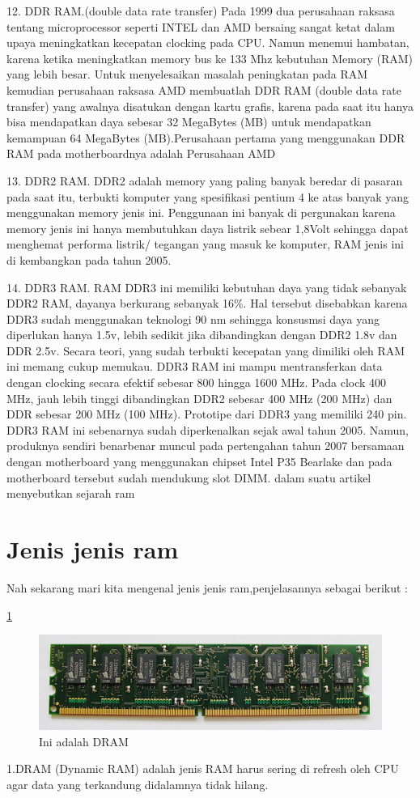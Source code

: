 12. DDR RAM.(double data rate transfer) Pada 1999 dua perusahaan raksasa tentang microprocessor seperti INTEL dan AMD bersaing sangat ketat dalam upaya meningkatkan kecepatan clocking pada CPU. Namun menemui hambatan, karena ketika meningkatkan memory bus ke 133 Mhz kebutuhan Memory (RAM) yang lebih besar. Untuk menyelesaikan masalah peningkatan pada RAM kemudian perusahaan raksasa AMD membuatlah DDR RAM (double data rate transfer) yang awalnya disatukan dengan kartu grafis, karena pada saat itu hanya bisa mendapatkan daya sebesar 32 MegaBytes (MB) untuk mendapatkan kemampuan 64 MegaBytes (MB).Perusahaan pertama yang menggunakan DDR RAM pada motherboardnya adalah Perusahaan AMD

13. DDR2 RAM. DDR2 adalah memory yang paling banyak beredar di pasaran pada saat itu, terbukti komputer yang spesifikasi pentium 4 ke atas banyak yang menggunakan memory jenis ini. Penggunaan ini banyak di pergunakan karena memory jenis ini hanya membutuhkan daya listrik sebear 1,8Volt sehingga dapat menghemat performa listrik/ tegangan yang masuk ke komputer, RAM jenis ini di kembangkan pada tahun 2005.

14. DDR3 RAM. RAM DDR3 ini memiliki kebutuhan daya yang tidak sebanyak DDR2 RAM, dayanya berkurang sebanyak 16\%. Hal tersebut disebabkan karena DDR3 sudah menggunakan teknologi 90 nm sehingga konsusmsi daya yang diperlukan hanya 1.5v, lebih sedikit jika dibandingkan dengan DDR2 1.8v dan DDR 2.5v. Secara teori, yang sudah terbukti kecepatan yang dimiliki oleh RAM ini memang cukup memukau. DDR3 RAM ini mampu mentransferkan data dengan clocking secara efektif sebesar 800 hingga 1600 MHz. Pada clock 400 MHz, jauh lebih tinggi dibandingkan DDR2 sebesar 400 MHz (200 MHz) dan DDR sebesar 200 MHz (100 MHz). Prototipe dari DDR3 yang memiliki 240 pin. DDR3 RAM ini sebenarnya sudah diperkenalkan sejak awal tahun 2005. Namun, produknya sendiri benar\-benar muncul pada pertengahan tahun 2007 bersamaan dengan motherboard yang menggunakan chipset Intel P35 Bearlake dan pada motherboard tersebut sudah mendukung slot DIMM.
dalam suatu artikel menyebutkan sejarah ram \cite{kan1995random}

\section{Jenis \- jenis ram}
Nah sekarang mari kita mengenal jenis \- jenis ram,penjelasannya sebagai berikut :

\ref{DRAM}
  \begin{figure}[ht]
  \centerline{\includegraphics[width=1\textwidth]{figures/DRAM.jpg}}
  \caption{Ini adalah DRAM}
  \label{DRAM}
  \end{figure}
1.DRAM (Dynamic RAM) adalah jenis RAM harus sering di refresh oleh CPU agar data yang terkandung didalamnya tidak hilang.
